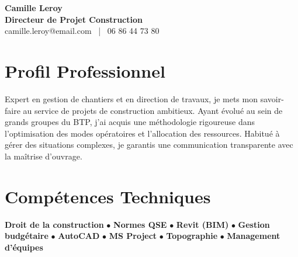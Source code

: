 \documentclass[11pt,a4paper]{article}
\begin{document}
\begin{center}
    {\Huge \textbf{Camille Leroy}} \\[0.2cm]
    {\Large \textbf{Directeur de Projet Construction}} \\[0.1cm]
    camille.leroy@email.com \ | \ 06 86 44 73 80
\end{center}

\vspace{0.3cm}

\section*{Profil Professionnel}
\noindent
Expert en gestion de chantiers et en direction de travaux, je mets mon savoir-faire au service de projets de construction ambitieux. Ayant évolué au sein de grands groupes du BTP, j'ai acquis une méthodologie rigoureuse dans l'optimisation des modes opératoires et l'allocation des ressources. Habitué à gérer des situations complexes, je garantis une communication transparente avec la maîtrise d'ouvrage.

\vspace{0.3cm}

\section*{Compétences Techniques}
\noindent
\textbf{Droit de la construction} $\bullet$ \textbf{Normes QSE} $\bullet$ \textbf{Revit (BIM)} $\bullet$ \textbf{Gestion budgétaire} $\bullet$ \textbf{AutoCAD} $\bullet$ \textbf{MS Project} $\bullet$ \textbf{Topographie} $\bullet$ \textbf{Management d'équipes}

\vspace{0.3cm}

\end{document}
